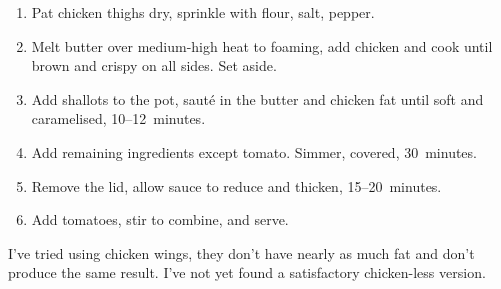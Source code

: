 
\begin{ingredients}
\end{ingredients}


\begin{recipe}
  \begin{enumerate}

  \item Pat chicken thighs dry, sprinkle with flour, salt, pepper.

  \item Melt butter over medium-high heat to foaming, add chicken and
    cook until brown and crispy on all sides.  Set aside.

  \item Add shallots to the pot, sauté in the butter and chicken fat
    until soft and caramelised, 10--12~minutes.

  \item Add remaining ingredients except tomato.  Simmer, covered,
    30~minutes.

  \item Remove the lid, allow sauce to reduce and thicken, 15--20~minutes.

  \item Add tomatoes, stir to combine, and serve.

  \end{enumerate}
\end{recipe}

\notes I've tried using chicken wings, they don't have nearly as much
fat and don't produce the same result.  I've not yet found a
satisfactory chicken-less version.


